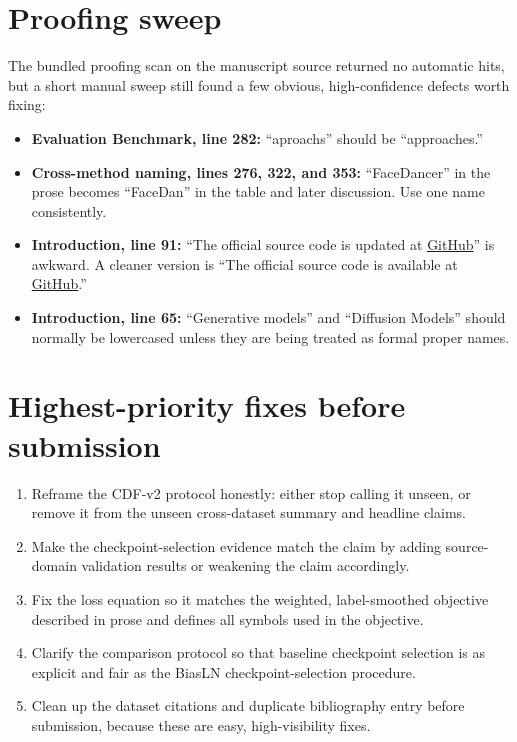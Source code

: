 \documentclass[11pt]{article}
\begin{document}
\section*{Proofing sweep}
The bundled proofing scan on the manuscript source returned no automatic hits, but a short manual sweep still found a few obvious, high-confidence defects worth fixing:
\begin{itemize}
    \item \textbf{Evaluation Benchmark, line 282:} ``aproachs'' should be ``approaches.''
    \item \textbf{Cross-method naming, lines 276, 322, and 353:} ``FaceDancer'' in the prose becomes ``FaceDan'' in the table and later discussion. Use one name consistently.
    \item \textbf{Introduction, line 91:} ``The official source code is updated at \href{https://github.com/ducthinh4477/BiasLN}{GitHub}'' is awkward. A cleaner version is ``The official source code is available at \href{https://github.com/ducthinh4477/BiasLN}{GitHub}.''
    \item \textbf{Introduction, line 65:} ``Generative models'' and ``Diffusion Models'' should normally be lowercased unless they are being treated as formal proper names.
\end{itemize}

\section*{Highest-priority fixes before submission}
\begin{enumerate}
    \item Reframe the CDF-v2 protocol honestly: either stop calling it unseen, or remove it from the unseen cross-dataset summary and headline claims.
    \item Make the checkpoint-selection evidence match the claim by adding source-domain validation results or weakening the claim accordingly.
    \item Fix the loss equation so it matches the weighted, label-smoothed objective described in prose and defines all symbols used in the objective.
    \item Clarify the comparison protocol so that baseline checkpoint selection is as explicit and fair as the BiasLN checkpoint-selection procedure.
    \item Clean up the dataset citations and duplicate bibliography entry before submission, because these are easy, high-visibility fixes.
\end{enumerate}
\end{document}
